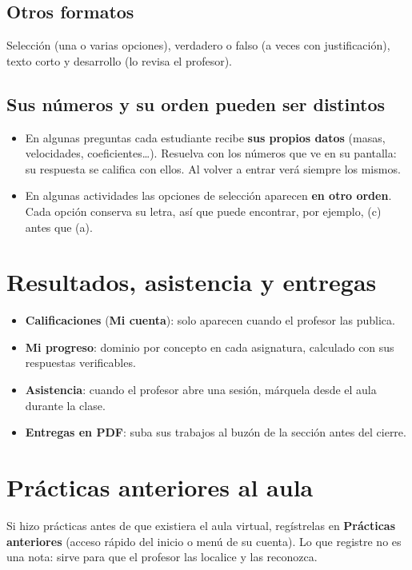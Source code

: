 \documentclass[11pt,a4paper,oneside]{book}
\newcommand{\menu}[1]{\textsf{\textbf{#1}}}
\begin{document}
\section{Otros formatos}
Selección (una o varias opciones), verdadero o falso (a veces con justificación), texto corto y desarrollo
(lo revisa el profesor).

\section{Sus números y su orden pueden ser distintos}
\begin{itemize}
  \item En algunas preguntas cada estudiante recibe \textbf{sus propios datos} (masas, velocidades, coeficientes\ldots).
        Resuelva con los números que ve en su pantalla: su respuesta se califica con ellos. Al volver a entrar verá
        siempre los mismos.
  \item En algunas actividades las opciones de selección aparecen \textbf{en otro orden}. Cada opción conserva su
        letra, así que puede encontrar, por ejemplo, (c) antes que (a).
\end{itemize}

\chapter{Resultados, asistencia y entregas}
\begin{itemize}
  \item \textbf{Calificaciones} (\menu{Mi cuenta}): solo aparecen cuando el profesor las publica.
  \item \textbf{Mi progreso}: dominio por concepto en cada asignatura, calculado con sus respuestas verificables.
  \item \textbf{Asistencia}: cuando el profesor abre una sesión, márquela desde el aula durante la clase.
  \item \textbf{Entregas en PDF}: suba sus trabajos al buzón de la sección antes del cierre.
\end{itemize}

\chapter{Prácticas anteriores al aula}
Si hizo prácticas antes de que existiera el aula virtual, regístrelas en \menu{Prácticas anteriores} (acceso rápido del
inicio o menú de su cuenta). Lo que registre no es una nota: sirve para que el profesor las localice y las reconozca.
\end{document}
